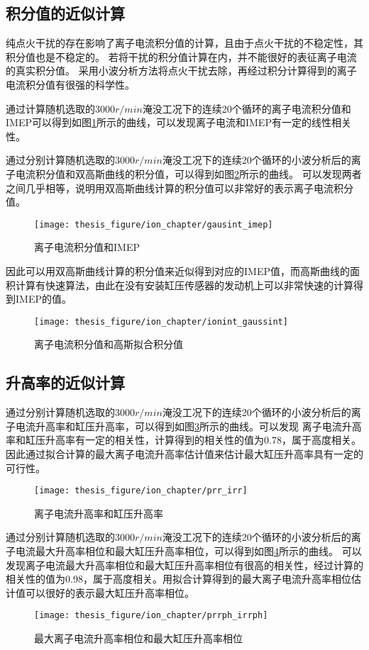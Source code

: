 \subsection{积分值的近似计算}
纯点火干扰的存在影响了离子电流积分值的计算，且由于点火干扰的不稳定性，其积分值也是不稳定的。
若将干扰的积分值计算在内，并不能很好的表征离子电流的真实积分值。
采用小波分析方法将点火干扰去除，再经过积分计算得到的离子电流积分值有很强的科学性。\par
通过计算随机选取的$3000r/min$淹没工况下的连续20个循环的离子电流积分值和IMEP可以得到如图\ref{fig:integer_imep}所示的曲线，可以发现离子电流和IMEP有一定的线性相关性。\par
通过分别计算随机选取的$3000r/min$淹没工况下的连续20个循环的小波分析后的离子电流积分值和双高斯曲线的积分值，可以得到如图\ref{fig:ionint_gaussint}所示的曲线。
可以发现两者之间几乎相等，说明用双高斯曲线计算的积分值可以非常好的表示离子电流积分值。\par
\begin{figure}[htb]
	\centering
	\texttt{[image: thesis\_figure/ion\_chapter/gausint\_imep]}
	\caption{\label{fig:integer_imep}离子电流积分值和IMEP}
\end{figure}
因此可以用双高斯曲线计算的积分值来近似得到对应的IMEP值，而高斯曲线的面积计算有快速算法，由此在没有安装缸压传感器的发动机上可以非常快速的计算得到IMEP的值。
\begin{figure}[htb]
	\centering
	\texttt{[image: thesis\_figure/ion\_chapter/ionint\_gaussint]}
	\caption{\label{fig:ionint_gaussint}离子电流积分值和高斯拟合积分值}
\end{figure}
\subsection{升高率的近似计算}
通过分别计算随机选取的$3000r/min$淹没工况下的连续20个循环的小波分析后的离子电流升高率和缸压升高率，可以得到如图\ref{fig:prr_irr}所示的曲线。可以发现
离子电流升高率和缸压升高率有一定的相关性，计算得到的相关性的值为0.78，属于高度相关。因此通过拟合计算的最大离子电流升高率估计值来估计最大缸压升高率具有一定的可行性。\par
\begin{figure}[htb]
	\centering
	\texttt{[image: thesis\_figure/ion\_chapter/prr\_irr]}
	\caption{\label{fig:prr_irr}离子电流升高率和缸压升高率}
\end{figure}
通过分别计算随机选取的$3000r/min$淹没工况下的连续20个循环的小波分析后的离子电流最大升高率相位和最大缸压升高率相位，可以得到如图\ref{fig:prrph_irrph}所示的曲线。
可以发现离子电流最大升高率相位和最大缸压升高率相位有很高的相关性，经过计算的相关性的值为0.98，属于高度相关。用拟合计算得到的最大离子电流升高率相位估计值可以很好的表示最大缸压升高率相位。
\begin{figure}[htb]
	\centering
	\texttt{[image: thesis\_figure/ion\_chapter/prrph\_irrph]}
	\caption{\label{fig:prrph_irrph}最大离子电流升高率相位和最大缸压升高率相位}
\end{figure}
